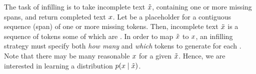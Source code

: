 The task of infilling is to take incomplete text $\tilde{x}$, containing one or more missing spans, and return completed text $x$. 
Let \blank{} be a placeholder for a contiguous sequence (span) of one or more missing tokens.
Then, incomplete text $\tilde{x}$ is a sequence of tokens some of which are \blank{}.
In order to map $\tilde{x}$ to $x$, an infilling strategy must specify both \emph{how many} and \emph{which} tokens to generate for each \blank. 
Note that there may be many reasonable $x$ for a given $\tilde{x}$. 
Hence, we are interested in learning a distribution $p(x \mid \tilde{x})$. 